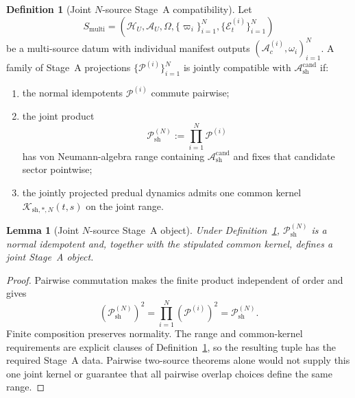 \documentclass[12pt]{article}
\newtheorem{lemma}[theorem]{Lemma}
\theoremstyle{definition}
\newtheorem{definition}[theorem]{Definition}
\theoremstyle{remark}
\begin{document}
\begin{definition}[Joint \(N\)-source Stage~A compatibility]
\label{def:Nconds}
Let
\[
S_{\mathrm{multi}}
=
(\mathcal H_U,\mathcal A_U,\Omega,
 \{\varpi_i\}_{i=1}^N,\{\mathcal E_t^{(i)}\}_{i=1}^N)
\]
be a multi-source datum with individual manifest outputs
\((\mathcal A_c^{(i)},\omega_i)_{i=1}^N\). A family of Stage~A
projections \(\{\mathcal P^{(i)}\}_{i=1}^N\) is jointly compatible with
\(\mathcal A_{\mathrm{sh}}^{\mathrm{cand}}\) if:
\begin{enumerate}
\item the normal idempotents \(\mathcal P^{(i)}\) commute pairwise;
\item the joint product
  \[
  \mathcal P_{\mathrm{sh}}^{(N)}
  :=\prod_{i=1}^N\mathcal P^{(i)}
  \]
  has von Neumann-algebra range containing
  \(\mathcal A_{\mathrm{sh}}^{\mathrm{cand}}\) and fixes that candidate
  sector pointwise;
\item the jointly projected predual dynamics admits one common kernel
  \(\mathcal K_{\mathrm{sh},*,N}(t,s)\) on the joint range.
\end{enumerate}
\end{definition}

\begin{lemma}[Joint \(N\)-source Stage~A object]\label{lem:jointAN}
Under Definition~\ref{def:Nconds},
\(\mathcal P_{\mathrm{sh}}^{(N)}\) is a normal idempotent and, together
with the stipulated common kernel, defines a joint Stage~A object.
\end{lemma}

\begin{proof}
Pairwise commutation makes the finite product independent of order and
gives
\[
(\mathcal P_{\mathrm{sh}}^{(N)})^2
=\prod_{i=1}^N(\mathcal P^{(i)})^2
=\mathcal P_{\mathrm{sh}}^{(N)}.
\]
Finite composition preserves normality. The range and common-kernel
requirements are explicit clauses of Definition~\ref{def:Nconds}, so
the resulting tuple has the required Stage~A data. Pairwise two-source
theorems alone would not supply this one joint kernel or guarantee that
all pairwise overlap choices define the same range.
\end{proof}
\end{document}

